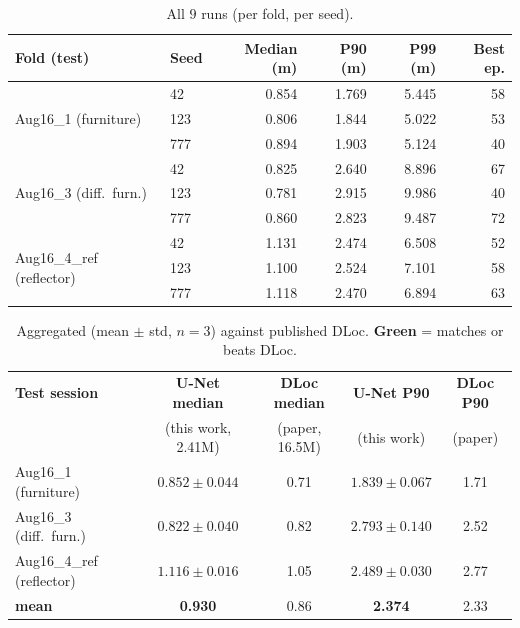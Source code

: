 \documentclass[11pt,a4paper]{article}
\newcommand{\best}[1]{\textcolor{ours}{\textbf{#1}}}
\begin{document}
\begin{table}[H]
\centering
\caption{All $9$ runs (per fold, per seed).}
\begin{tabular}{@{}llrrrr@{}}
\toprule
\textbf{Fold (test)} & \textbf{Seed} & \textbf{Median (m)} & \textbf{P90 (m)} & \textbf{P99 (m)} & \textbf{Best ep.} \\
\midrule
\multirow{3}{*}{Aug16\_1 (furniture)}
 & 42  & 0.854 & 1.769 & 5.445 & 58 \\
 & 123 & 0.806 & 1.844 & 5.022 & 53 \\
 & 777 & 0.894 & 1.903 & 5.124 & 40 \\
\midrule
\multirow{3}{*}{Aug16\_3 (diff.\ furn.)}
 & 42  & 0.825 & 2.640 & 8.896 & 67 \\
 & 123 & 0.781 & 2.915 & 9.986 & 40 \\
 & 777 & 0.860 & 2.823 & 9.487 & 72 \\
\midrule
\multirow{3}{*}{Aug16\_4\_ref (reflector)}
 & 42  & 1.131 & 2.474 & 6.508 & 52 \\
 & 123 & 1.100 & 2.524 & 7.101 & 58 \\
 & 777 & 1.118 & 2.470 & 6.894 & 63 \\
\bottomrule
\end{tabular}
\end{table}

\begin{table}[H]
\centering
\caption{Aggregated (mean $\pm$ std, $n=3$) against published DLoc. \best{Green} = matches or
beats DLoc.}
\label{tab:agg}
\begin{tabular}{@{}lcccc@{}}
\toprule
\textbf{Test session} & \textbf{U-Net median} & \textbf{DLoc median} & \textbf{U-Net P90} & \textbf{DLoc P90} \\
 & \footnotesize(this work, 2.41M) & \footnotesize(paper, 16.5M) & \footnotesize(this work) & \footnotesize(paper) \\
\midrule
Aug16\_1 (furniture)      & $0.852 \pm 0.044$ & 0.71 & $1.839 \pm 0.067$ & 1.71 \\
Aug16\_3 (diff.\ furn.)   & \best{$0.822 \pm 0.040$} & 0.82 & $2.793 \pm 0.140$ & 2.52 \\
Aug16\_4\_ref (reflector) & $1.116 \pm 0.016$ & 1.05 & \best{$2.489 \pm 0.030$} & 2.77 \\
\midrule
\textbf{mean}             & \textbf{0.930} & 0.86 & \textbf{2.374} & 2.33 \\
\bottomrule
\end{tabular}
\end{table}
\end{document}

